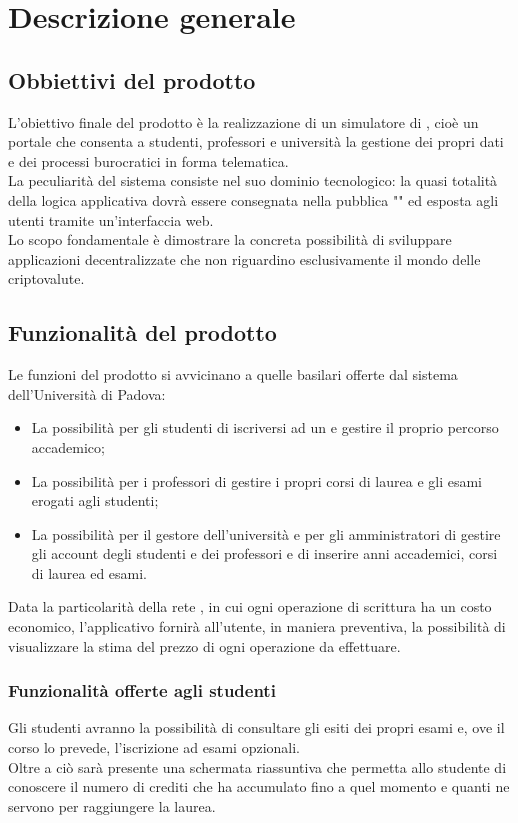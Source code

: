 \documentclass[AnalisiDeiRequisiti.tex]{subfiles}
\begin{document}
\chapter{Descrizione generale}
\section{Obbiettivi del prodotto}
L'obiettivo finale del prodotto è la realizzazione di un simulatore di , cioè un portale che consenta a studenti, professori e università la gestione dei propri dati e dei processi burocratici in forma telematica. \\
La peculiarità del sistema consiste nel suo dominio tecnologico: la quasi totalità della logica applicativa dovrà essere consegnata nella  pubblica "" ed esposta agli utenti tramite un'interfaccia web. \\
Lo scopo fondamentale è dimostrare la concreta possibilità di sviluppare applicazioni decentralizzate che non riguardino esclusivamente il mondo delle criptovalute.

\section{Funzionalità del prodotto}
Le funzioni del prodotto si avvicinano a quelle basilari offerte dal sistema  dell'Università di Padova:
\begin{itemize}
	\item La possibilità per gli studenti di iscriversi ad un  e gestire il proprio percorso accademico;
	\item La possibilità per i professori di gestire i propri corsi di laurea e gli esami erogati agli studenti;
	\item La possibilità per il gestore dell'università e per gli amministratori di gestire gli account degli studenti e dei professori e di inserire anni accademici, corsi di laurea ed esami.
\end{itemize}
Data la particolarità della rete , in cui ogni operazione di scrittura ha un costo economico, l'applicativo fornirà all'utente, in maniera preventiva, la possibilità di visualizzare la stima del prezzo di ogni operazione da effettuare.

\subsection{Funzionalità offerte agli studenti}
Gli studenti avranno la possibilità di consultare gli esiti dei propri esami e, ove il corso lo prevede, l'iscrizione ad esami opzionali.\\
Oltre a ciò sarà presente una schermata riassuntiva che permetta allo studente di conoscere il numero di crediti che ha accumulato fino a quel momento e quanti ne servono per raggiungere la laurea.
\end{document}
